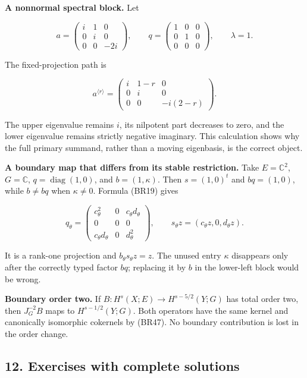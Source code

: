 \documentclass[
  11pt,
]{article}
\begin{document}
\textbf{A nonnormal spectral block.} Let

\[
 a=
 \begin{pmatrix}i&1&0\\0&i&0\\0&0&-2i\end{pmatrix},
 \qquad
 q=\begin{pmatrix}1&0&0\\0&1&0\\0&0&0\end{pmatrix},
 \qquad\lambda=1 .
 \tag{BR49}
\]

The fixed-projection path is

\[
 a^{\langle r\rangle}
 =
 \begin{pmatrix}
 i&1-r&0\\
 0&i&0\\
 0&0&-i(2-r)
 \end{pmatrix}.
 \tag{BR50}
\]

The upper eigenvalue remains \(i\), its nilpotent part decreases to
zero, and the lower eigenvalue remains strictly negative imaginary. This
calculation shows why the full primary summand, rather than a moving
eigenbasis, is the correct object.

\textbf{A boundary map that differs from its stable restriction.} Take
\(E=\mathbb C^2\), \(G=\mathbb C\), \(q=\operatorname{diag}(1,0)\), and
\(b=(1,\kappa)\). Then \(s=(1,0)^t\) and \(bq=(1,0)\), while \(b\ne bq\)
when \(\kappa\ne0\). Formula (BR19) gives

\[
 q_\theta=
 \begin{pmatrix}
 c_\theta^2&0&c_\theta d_\theta\\
 0&0&0\\
 c_\theta d_\theta&0&d_\theta^2
 \end{pmatrix},
 \qquad
 s_\theta z=(c_\theta z,0,d_\theta z).
 \tag{BR51}
\]

It is a rank-one projection and \(b_\theta s_\theta z=z\). The unused
entry \(\kappa\) disappears only after the correctly typed factor
\(bq\); replacing it by \(b\) in the lower-left block would be wrong.

\textbf{Boundary order two.} If \(B:H^s(X;E)\to H^{s-5/2}(Y;G)\) has
total order two, then \(J_G^{-2}B\) maps to \(H^{s-1/2}(Y;G)\). Both
operators have the same kernel and canonically isomorphic cokernels by
(BR47). No boundary contribution is lost in the order change.

\subsection{12. Exercises with complete
solutions}\label{exercises-with-complete-solutions}
\end{document}
